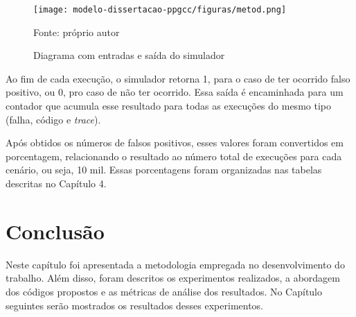 \begin{figure}[ht]
    \centering
    \texttt{[image: modelo-dissertacao-ppgcc/figuras/metod.png]}
    \caption{Diagrama com entradas e saída do simulador}{Fonte: próprio autor}
    \label{fig:metod}
\end{figure}

Ao fim de cada execução, o simulador retorna 1, para o caso de ter ocorrido falso positivo, ou 0, pro caso de não ter ocorrido. Essa saída é encaminhada para um contador que acumula esse resultado para todas as execuções do mesmo tipo (falha, código e \textit{trace}). 

Após obtidos os números de falsos positivos, esses valores foram convertidos em porcentagem, relacionando o resultado ao número total de execuções para cada cenário, ou seja, 10 mil. Essas porcentagens foram organizadas nas tabelas descritas no Capítulo 4.

\section{Conclusão}

Neste capítulo foi apresentada a metodologia empregada no desenvolvimento do trabalho. Além disso, foram descritos os experimentos realizados, a abordagem dos códigos propostos e as métricas de análise dos resultados. No Capítulo seguintes serão mostrados os resultados desses experimentos.